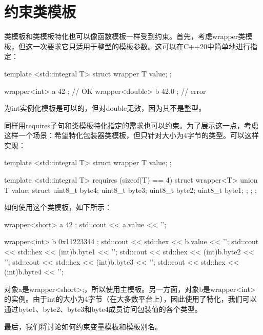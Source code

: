 \section{约束类模板}
类模板和类模板特化也可以像函数模板一样受到约束。首先，考虑wrapper类模板，但这一次要求它只适用于整型的模板参数。这可以在C++20中简单地进行指定：

\begin{cpp}
template <std::integral T>
struct wrapper
{
	T value;
};

wrapper<int> a{ 42 }; // OK
wrapper<double> b{ 42.0 }; // error
\end{cpp}

为int实例化模板是可以的，但对double无效，因为其不是整型。

同样用requires子句和类模板特化指定的需求也可以约束。为了展示这一点，考虑这样一个场景：希望特化包装器类模板，但只针对大小为4字节的类型。可以这样实现：

\begin{cpp}
template <std::integral T>
struct wrapper
{
	T value;
};

template <std::integral T>
requires (sizeof(T) == 4)
struct wrapper<T>
{
	union
	{
		T value;
		struct
		{
			uint8_t byte4;
			uint8_t byte3;
			uint8_t byte2;
			uint8_t byte1;
		};
	};
};
\end{cpp}

如何使用这个类模板，如下所示：

\begin{cpp}
wrapper<short> a{ 42 };
std::cout << a.value << '\n';

wrapper<int> b{ 0x11223344 };
std::cout << std::hex << b.value << '\n';
std::cout << std::hex << (int)b.byte1 << '\n';
std::cout << std::hex << (int)b.byte2 << '\n';
std::cout << std::hex << (int)b.byte3 << '\n';
std::cout << std::hex << (int)b.byte4 << '\n';
\end{cpp}

对象a是wrapper<short>;，所以使用主模板。另一方面，对象b是wrapper<int>的实例。由于int的大小为4字节（在大多数平台上），因此使用了特化，我们可以通过byte1、byte2、byte3和byte4成员访问包装值的各个类型。

最后，我们将讨论如何约束变量模板和模板别名。




































































